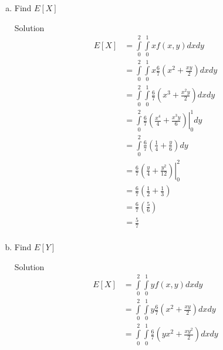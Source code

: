 \documentclass{article}
\begin{document}
\begin{spacing}{1.1}
\begin{homeworkProblem}
\begin{enumerate}[(a)]
\begin{homeworkSection}{Solution}
\begin{align*}
            \left(\left(\frac{ 5}{ 32}\right) 
            - \left(\frac{19}{ 384}\right)\right)\\
          &= \frac{ 6}{ 7}\left(\frac{ 41}{ 384}\right)\\
          &= \frac{ 41}{ 448}\\
        \end{align*}
      \end{homeworkSection}
    \item Find $E[ X]$
      \begin{homeworkSection}{Solution}
        \begin{align*}
          E[ X] &= \int\limits_0^2 \int\limits_0^1 x f( x, y) dx dy\\
            &= \int\limits_0^2 \int\limits_0^1 x \frac{ 6}{ 7} 
              \left(x^2 + \frac{ x y}{ 2}\right) dx dy\\
            &= \int\limits_0^2 \int\limits_0^1 \frac{ 6}{ 7} 
              \left(x^3 + \frac{ x^2 y}{ 2}\right) dx dy\\
            &= \int\limits_0^2 \left.\frac{ 6}{ 7} 
              \left(\frac{ x^4}{ 4} + \frac{ x^3 y}{ 6}\right)\right|_0^1 dy\\
            &= \int\limits_0^2 \frac{ 6}{ 7} 
              \left(\frac{ 1}{ 4} + \frac{ y}{ 6}\right) dy\\
            &= \left.\frac{ 6}{ 7} 
              \left(\frac{ y}{ 4} + \frac{ y^2}{ 12}\right)\right|_0^2 \\
            &= \frac{ 6}{ 7} \left(\frac{ 1}{ 2} + \frac{ 1}{ 3}\right) \\
            &= \frac{ 6}{ 7} \left(\frac{ 5}{ 6}\right) \\
            &= \frac{ 5}{ 7} \\
        \end{align*}
      \end{homeworkSection}
    \item Find $E[ Y]$
      \begin{homeworkSection}{Solution}
        \begin{align*}
          E[ X] &= \int\limits_0^2 \int\limits_0^1 y f( x, y) dx dy\\
            &= \int\limits_0^2 \int\limits_0^1 y \frac{ 6}{ 7} 
              \left(x^2 + \frac{ x y}{ 2}\right) dx dy\\
            &= \int\limits_0^2 \int\limits_0^1 \frac{ 6}{ 7} 
              \left( y x^2 + \frac{ x y^2}{ 2}\right) dx dy\\

\end{align*}
\end{homeworkSection}
\end{enumerate}
\end{homeworkProblem}
\end{spacing}
\end{document}
